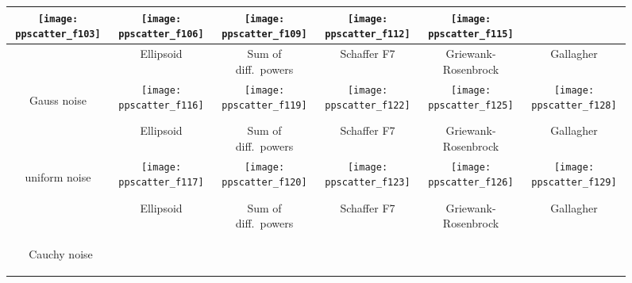 \documentclass[sigconf]{acmart}
\begin{document}
{\begin{figure*}
\begin{tabular}{@{}c@{}*{5}{@{}c@{}}}
    \texttt{[image: ppscatter\_f103]}&
    \texttt{[image: ppscatter\_f106]}&
    \texttt{[image: ppscatter\_f109]}&
    \texttt{[image: ppscatter\_f112]}&
    \texttt{[image: ppscatter\_f115]}\\\hline
 & { Ellipsoid} & { Sum of diff.\ powers} & { Schaffer F7} & { Griewank-Rosenbrock} & { Gallagher}\\
\begin{turn}{90}\parbox{0.175\textwidth}{\centering\sf Gauss noise\vspace{1em}}\end{turn} &
    \texttt{[image: ppscatter\_f116]}&
    \texttt{[image: ppscatter\_f119]}&
    \texttt{[image: ppscatter\_f122]}&
    \texttt{[image: ppscatter\_f125]}&
    \texttt{[image: ppscatter\_f128]}\\
 & { Ellipsoid} & { Sum of diff.\ powers} & { Schaffer F7} & { Griewank-Rosenbrock} & { Gallagher}\\
\begin{turn}{90}\parbox{0.175\textwidth}{\centering\sf uniform noise\vspace{1em}}\end{turn} &
    \texttt{[image: ppscatter\_f117]}&
    \texttt{[image: ppscatter\_f120]}&
    \texttt{[image: ppscatter\_f123]}&
    \texttt{[image: ppscatter\_f126]}&
    \texttt{[image: ppscatter\_f129]}\\
& { Ellipsoid} & { Sum of diff.\ powers} & { Schaffer F7} & { Griewank-Rosenbrock} & { Gallagher}\\
\begin{turn}{90}\parbox{0.175\textwidth}{~\centering\sf Cauchy noise\vspace{1em}}\end{turn} &

\end{tabular}
\end{figure*}}
\end{document}
